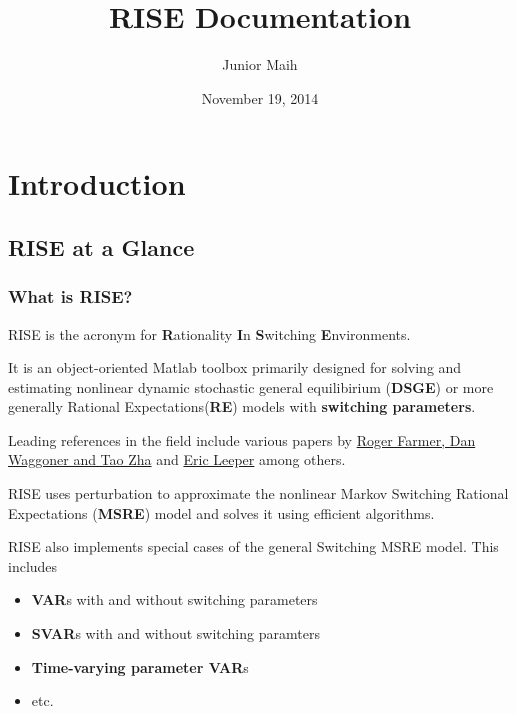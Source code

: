 \documentclass[letterpaper,10pt,english]{sphinxmanual}
\title{RISE Documentation}
\date{November 19, 2014}
\author{Junior Maih}
\begin{document}
\maketitle
\tableofcontents
{}\label{master_doc::doc}



\chapter{Introduction}
\label{introduction:introduction}\label{introduction::doc}\label{introduction:welcome-to-rise-s-documentation}

\section{RISE at a Glance}
\label{intro_folder/rise_at_a_glance::doc}\label{intro_folder/rise_at_a_glance:rise-at-a-glance}

\subsection{What is RISE?}
\label{intro_folder/rise_at_a_glance:what-is-rise}
RISE is the acronym for \textbf{R}ationality \textbf{I}n \textbf{S}witching \textbf{E}nvironments.

It is an object-oriented Matlab toolbox primarily designed for solving and estimating nonlinear
dynamic stochastic general equilibirium (\textbf{DSGE}) or more generally
Rational Expectations(\textbf{RE}) models with \textbf{switching parameters}.

Leading references in the field include various papers by \href{http://www.tzha.net/articles}{Roger Farmer, Dan Waggoner and Tao Zha}
and \href{http://php.indiana.edu/~eleeper/\#Papers}{Eric Leeper} among others.

RISE uses perturbation to approximate the nonlinear Markov Switching Rational
Expectations (\textbf{MSRE}) model and solves it using efficient algorithms.

RISE also implements special cases of the general Switching MSRE model. This includes
\begin{itemize}
\item {} 
\textbf{VAR}s with and without switching parameters

\item {} 
\textbf{SVAR}s with and without switching paramters

\item {} 
\textbf{Time-varying parameter VAR}s

\item {} 
etc.

\end{itemize}
\end{document}
